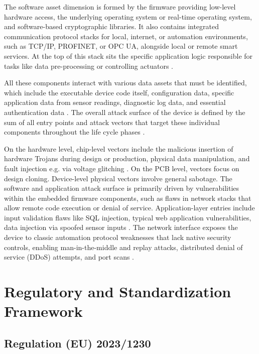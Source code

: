 The software asset dimension is formed by the firmware providing low-level hardware access, the underlying operating system or real-time operating system, and software-based cryptographic libraries. It also contains integrated communication protocol stacks for local, internet, or automation environments, such as TCP/IP, PROFINET, or OPC UA, alongside local or remote smart services. At the top of this stack sits the specific application logic responsible for tasks like data pre-processing or controlling actuators \cite[p. 4]{liebl2024analyzingattacksurfacethreats}. 

All these components interact with various data assets that must be identified, which include the executable device code itself, configuration data, specific application data from sensor readings, diagnostic log data, and essential authentication data \cite[p. 4]{liebl2024analyzingattacksurfacethreats}.
The overall attack surface of the device is defined by the sum of all entry points and attack vectors that target these individual components throughout the life cycle phases \cite[p. 1]{liebl2024analyzingattacksurfacethreats}. 

On the hardware level, chip-level vectors include the malicious insertion of hardware Trojans during design or production, physical data manipulation, and fault injection e.g. via voltage glitching \cite[p. 8]{liebl2024analyzingattacksurfacethreats}.
On the PCB level, vectors focus on design cloning. Device-level physical vectors involve general sabotage.
The software and application attack surface is primarily driven by vulnerabilities within the embedded firmware components, such as flaws in network stacks that allow remote code execution or denial of service. Application-layer entries include input validation flaws like SQL injection, typical web application vulnerabilities, data injection via spoofed sensor inputs \cite[p. 8]{liebl2024analyzingattacksurfacethreats}. 
The network interface exposes the device to classic automation protocol weaknesses that lack native security controls, enabling man-in-the-middle and replay attacks, distributed denial of service (DDoS) attempts, and port scans \cite[p. 9]{liebl2024analyzingattacksurfacethreats}.


\section{Regulatory and Standardization Framework} 
\label{sec:regulatory_framework} 

\subsection{Regulation (EU) 2023/1230}
\label{subsec:eu_machinery_regulation}

